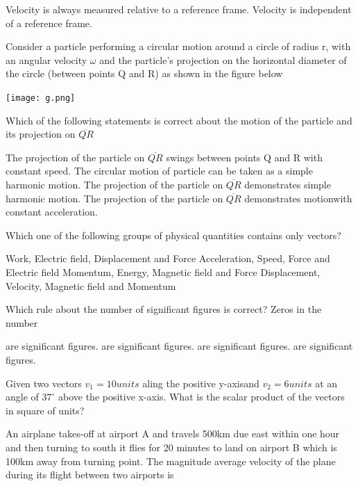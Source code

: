 \documentclass[12pt,addpoints]{exam}
\begin{document}
\begin{questions}
\begin{choices}
			\choice Velocity is always measured relative to a reference frame.
			\choice Velocity is independent of a reference frame.
		\end{choices}
		\question Consider a particle performing a circular motion around a circle of radius r, with an angular velocity $\omega$ and the particle's projection on the horizontal diameter of the circle (between points Q and R) as shown in the figure below 
		\begin{center}
			\texttt{[image: g.png]}
		\end{center}
		Which of the following statements is correct about the motion of the particle and its projection on $\overline{QR}$\\
		\begin{choices}
			\choice The projection of the particle on $\overline{QR}$ swings between points Q and R with constant speed.
			\choice The circular motion of particle can be taken as a simple harmonic motion.
			\choice The projection of the particle on $\overline{QR}$ demonstrates simple harmonic motion.
			\choice The projection of the particle on $\overline{QR}$ demonstrates motionwith constant acceleration.
		\end{choices}
		\question Which one of the following groups of physical quantities contains only vectors?\\
		\begin{choices}
			\choice Work, Electric field, Displacement and Force
			\choice Acceleration, Speed, Force and Electric field
			\choice Momentum, Energy, Magnetic field and Force
			\choice Displacement, Velocity, Magnetic field and Momentum
		\end{choices}
		\question Which rule about the number of significant figures is correct? Zeros in the number\\
		\begin{choices}
			 are significant figures.
			 are significant figures.
			 are significant figures.
			 are significant figures.
		\end{choices}
		\question Given two vectors $v_1=10 units$ aling the positive y-axisand $v_2=6 units$ at an angle of $37^{\circ}$ above the positive x-axis. What is the scalar product of the vectors in square of units?\\
		\begin{oneparchoices}
		\end{oneparchoices}
		\question An airplane takes-off at airport A and travels 500km due east within one hour and then turning to south it flies for 20 minutes to land on airport B which is 100km away from turning point. The magnitude average velocity of the plane during its flight between two airports is  \\ 

\end{questions}
\end{document}
